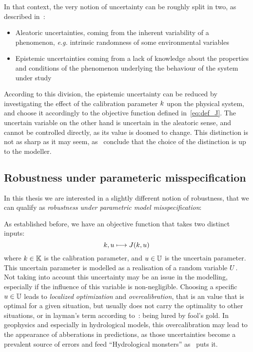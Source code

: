 \documentclass[../../Main_ManuscritThese.tex]{subfiles}
\begin{document}
In that context, the very notion of uncertainty can be roughly split in two, as described in~\cite{walker_defining_2003}:
\begin{itemize}
\item Aleatoric uncertainties, coming from the inherent variability of a phenomenon, \emph{e.g.} intrinsic randomness of some environmental variables
\item Epistemic uncertainties coming from a lack of knowledge about the properties and conditions of the phenomenon underlying the behaviour of the system under study
\end{itemize}
According to this division,  the epistemic uncertainty can be reduced by investigating the effect of the calibration parameter $k$ upon the physical system, and choose it accordingly to the objective function defined in~\cref{eq:def_J}.
The uncertain variable on the other hand is uncertain in the aleatoric sense, and cannot be controlled directly, as its value is doomed to change. This distinction is not as sharp as it may seem, as~\cite{kiureghian_aleatory_2009} conclude that the choice of the distinction is up to the modeller.



\subsection{Robustness under parameteric misspecification}
In this thesis we are interested in a slightly different notion of robustness, that we can qualify as \emph{robustness under parametric model misspecification}:

As established before, we have an objective function that takes two distinct inputs:
\begin{equation}
  \label{eq:def_J}
  k, u \longmapsto J(k,u)
\end{equation}
where $k\in \mathbb{K}$ is the calibration parameter, and $u \in \mathbb{U}$ is the uncertain parameter. This uncertain parameter is modelled as a realisation of a random variable $U$.
Not taking into account this uncertainty may be an issue in the modelling, especially if the influence of this variable is non-negligible.
Choosing a specific $u \in \mathbb{U}$ leads to \emph{localized optimization} \citep{huyse_free-form_2001} and \emph{overcalibration}, that is an value that is optimal for a given situation, but usually does not carry the optimality to other situations, or in layman's term according to~\cite{andreassian_all_2012}: being lured by fool's gold.
In geophysics and especially in hydrological models, this overcalibration may lead to the appearance of abberations in predictions, as those uncertainties become a prevalent source of errors and feed ``Hydrological monsters'' as~\cite{kuczera_there_2010} puts it.
\end{document}
